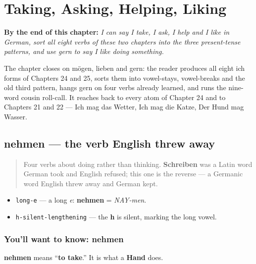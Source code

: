 
\chapter{Taking, Asking, Helping, Liking}
\label{ch:ge-doing-verbs}

\begin{chapteropening}
\textbf{By the end of this chapter:} \emph{I can say I take, I ask, I help and I like in German, sort all eight verbs of these two chapters into the three present-tense patterns, and use gern to say I like doing something.}

The chapter closes on mögen, lieben and gern: the reader produces all eight ich forms of Chapters 24 and 25, sorts them into vowel-stays, vowel-breaks and the old third pattern, hangs gern on four verbs already learned, and runs the nine-word cousin roll-call. It reaches back to every atom of Chapter 24 and to Chapters 21 and 22 — Ich mag das Wetter, Ich mag die Katze, Der Hund mag Wasser.
\end{chapteropening}

\section[nehmen]{nehmen — the verb English threw away}

\label{lesson:GE-C25-nehmen}



\begin{quote}
Four verbs about doing rather than thinking. \textbf{Schreiben} was a Latin word German took and English refused; this one is the reverse — a Germanic word English threw away and German kept.
\end{quote}

\begin{sounds}
\begin{itemize}
\raggedright
  \item \texttt{long-e} — a long \emph{e}: \textbf{nehmen} = \emph{NAY-men}.
  \item \texttt{h-silent-lengthening} — the \textbf{h} is silent, marking the long vowel.
\end{itemize}
\end{sounds}

\subsection*{You'll want to know: nehmen}
\textbf{nehmen} means \textquotedblleft{}\textbf{to take}.\textquotedblright{} It is what a \textbf{Hand} does.

